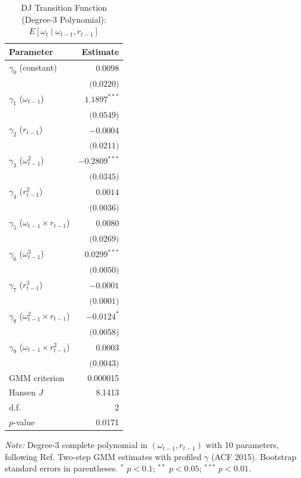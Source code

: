 \documentclass[a4paper, 12pt]{article}
\def\textcite#1{Ref}%
\begin{document}
\begin{table}[htbp]
\centering
\caption{DJ Transition Function (Degree-3 Polynomial): $E[\omega_t \mid \omega_{t-1}, r_{t-1}]$}
\label{tab:dj_transition}
\begin{tabular}{lr}
\toprule
Parameter & Estimate \\
\midrule
  $\gamma_0$ (constant) & $0.0098$ \\
  & $\text{(0.0220)}$ \\
  $\gamma_1$ ($\omega_{t-1}$) & $1.1897^{***}$ \\
  & $\text{(0.0549)}$ \\
  $\gamma_2$ ($r_{t-1}$) & $-0.0004$ \\
  & $\text{(0.0211)}$ \\
  $\gamma_3$ ($\omega_{t-1}^2$) & $-0.2809^{***}$ \\
  & $\text{(0.0345)}$ \\
  $\gamma_4$ ($r_{t-1}^2$) & $0.0014$ \\
  & $\text{(0.0036)}$ \\
  $\gamma_5$ ($\omega_{t-1} \times r_{t-1}$) & $0.0080$ \\
  & $\text{(0.0269)}$ \\
  $\gamma_6$ ($\omega_{t-1}^3$) & $0.0299^{***}$ \\
  & $\text{(0.0050)}$ \\
  $\gamma_7$ ($r_{t-1}^3$) & $-0.0001$ \\
  & $\text{(0.0001)}$ \\
  $\gamma_8$ ($\omega_{t-1}^2 \times r_{t-1}$) & $-0.0124^{*}$ \\
  & $\text{(0.0058)}$ \\
  $\gamma_9$ ($\omega_{t-1} \times r_{t-1}^2$) & $0.0003$ \\
  & $\text{(0.0043)}$ \\
\midrule
GMM criterion & 0.000015 \\
Hansen $J$ & 8.1413 \\
\quad d.f. & 2 \\
\quad $p$-value & 0.0171 \\
\bottomrule
\end{tabular}
\begin{flushleft}
\footnotesize
\textit{Note:} Degree-3 complete polynomial in $(\omega_{t-1}, r_{t-1})$ with 10 parameters,
following \textcite{doraszelski2013r}.
Two-step GMM estimates with profiled $\gamma$ (ACF 2015).
Bootstrap standard errors in parentheses.
$^{*}$ $p<0.1$; $^{**}$ $p<0.05$; $^{***}$ $p<0.01$.
\end{flushleft}
\end{table}
\end{document}
